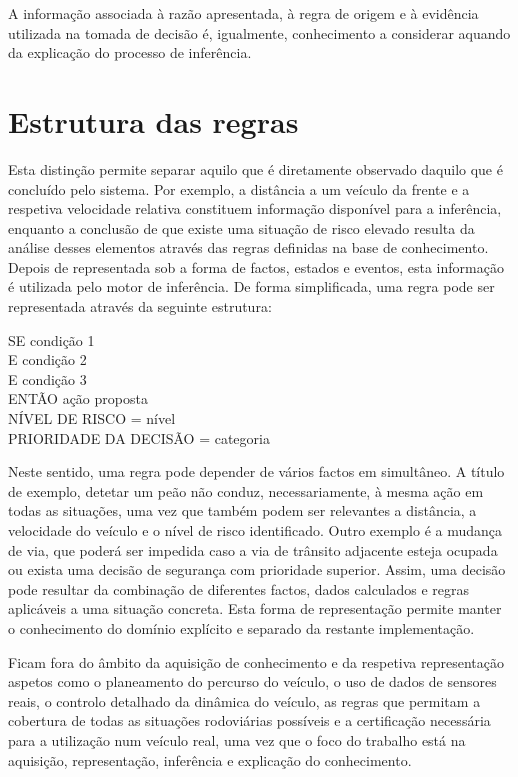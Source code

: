 A informação associada à razão apresentada, à regra de origem e à evidência
utilizada na tomada de decisão é, igualmente, conhecimento a considerar
aquando da explicação do processo de inferência.

\section{Estrutura das regras}
\label{sec:estrutura-regras}

Esta distinção permite separar aquilo que é diretamente observado daquilo que
é concluído pelo sistema. Por exemplo, a distância a um veículo da frente e a
respetiva velocidade relativa constituem informação disponível para a
inferência, enquanto a conclusão de que existe uma situação de risco elevado
resulta da análise desses elementos através das regras definidas na base de
conhecimento. Depois de representada sob a forma de factos, estados e
eventos, esta informação é utilizada pelo motor de inferência. De forma
simplificada, uma regra pode ser representada através da seguinte estrutura:

\begin{tcolorbox}[enhanced, colback=corFundo, colframe=corEscura,
    boxrule=0pt, leftrule=1.2pt, arc=0pt, outer arc=0pt,
    left=8pt, right=8pt, top=4pt, bottom=4pt,
    width=0.6\textwidth, center, fontupper=\ttfamily\small]
  SE condição 1\\
  E condição 2\\
  E condição 3\\
  ENTÃO ação proposta\\
  NÍVEL DE RISCO = nível\\
  PRIORIDADE DA DECISÃO = categoria
\end{tcolorbox}

Neste sentido, uma regra pode depender de vários factos em simultâneo. A
título de exemplo, detetar um peão não conduz, necessariamente, à mesma ação
em todas as situações, uma vez que também podem ser relevantes a distância, a
velocidade do veículo e o nível de risco identificado. Outro exemplo é a
mudança de via, que poderá ser impedida caso a via de trânsito adjacente
esteja ocupada ou exista uma decisão de segurança com prioridade superior.
Assim, uma decisão pode resultar da combinação de diferentes factos, dados
calculados e regras aplicáveis a uma situação concreta. Esta forma de
representação permite manter o conhecimento do domínio explícito e separado
da restante implementação.

Ficam fora do âmbito da aquisição de conhecimento e da respetiva
representação aspetos como o planeamento do percurso do veículo, o uso de
dados de sensores reais, o controlo detalhado da dinâmica do veículo, as
regras que permitam a cobertura de todas as situações rodoviárias possíveis e
a certificação necessária para a utilização num veículo real, uma vez que o
foco do trabalho está na aquisição, representação, inferência e explicação do
conhecimento.

